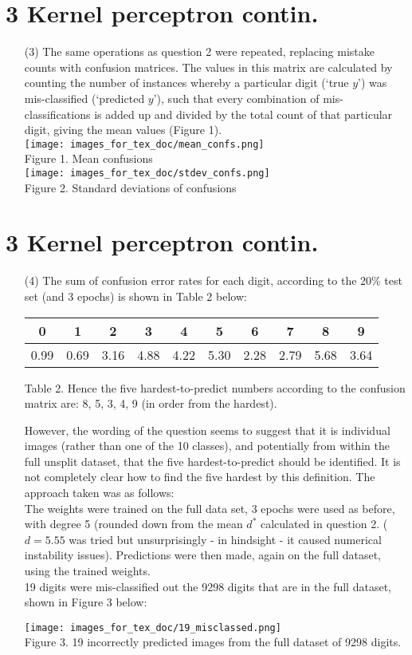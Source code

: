 \documentclass[a4paper,12pt]{article}
\begin{document}
\section*{3 Kernel perceptron contin.}
\begin{enumerate}

\item[(3)]
The same operations as question 2 were repeated, replacing mistake counts with confusion matrices. The values in this matrix are calculated by counting the number of instances whereby a particular digit (`true $y$') was mis-classified (`predicted $y$'), such that every combination of mis-classifications is added up and divided by the total count of that particular digit, giving the mean values (Figure 1). \\
\texttt{[image: images\_for\_tex\_doc/mean\_confs.png]}\\
Figure 1. Mean confusions \\
\texttt{[image: images\_for\_tex\_doc/stdev\_confs.png]}\\
Figure 2. Standard deviations of confusions\\
\end{enumerate}
\clearpage
\section*{3 Kernel perceptron contin.}
\begin{enumerate}
\item[(4)]
The sum of confusion error rates for each digit, according to the 20\% test set (and 3 epochs) is shown in Table 2 below:

\begin{tabular}{|c|c|c|c|c|c|c|c|c|c|}
\hline
0&1&2&3&4&5&6&7&8&9\\
\hline
0.99&0.69&3.16&4.88&4.22&5.30&2.28&2.79&5.68&3.64\\
\hline
\end{tabular}\par 
Table 2.
Hence the five hardest-to-predict numbers according to the confusion matrix are: 8, 5, 3, 4, 9 (in order from the hardest).

However, the wording of the question seems to suggest that it is individual images (rather than one of the 10 classes), and potentially from within the full unsplit dataset, that the five hardest-to-predict should be identified. It is not completely clear how to find the five hardest by this definition. The approach taken was as follows:\\
The weights were trained on the full data set, 3 epochs were used as before, with degree 5 (rounded down from the mean $d^*$ calculated in question 2. ($d=5.55$ was tried but unsurprisingly - in hindsight - it caused numerical instability issues). Predictions were then made, again on the full dataset, using the trained weights. \\
19 digits were mis-classified out the 9298 digits that are in the full dataset, shown in Figure 3 below:

\texttt{[image: images\_for\_tex\_doc/19\_misclassed.png]}\\
Figure 3. 19 incorrectly predicted images from the full dataset of 9298 digits.
\end{enumerate}
\clearpage
\end{document}

